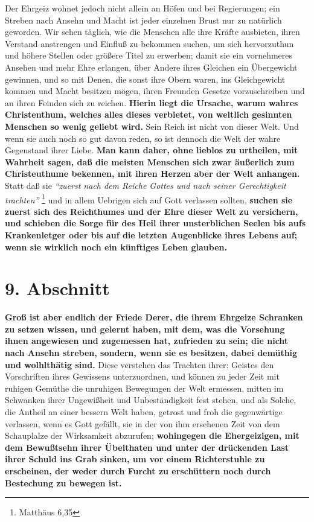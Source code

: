 Der Ehrgeiz wohnet jedoch nicht allein an Höfen und bei Regierungen; ein Streben
nach Ansehn und Macht ist jeder einzelnen Brust nur zu natürlich geworden. Wir
sehen täglich, wie die Menschen alle ihre Kräfte ausbieten, ihren Verstand
anstrengen und Einfluß zu bekommen suchen, um sich hervorzuthun und höhere
Stellen oder größere Titel zu erwerben; damit sie ein vornehmeres Ansehen und
mehr Ehre erlangen, über Andere ihres Gleichen ein Übergewicht gewinnen, und so
mit Denen, die sonst ihre Obern waren, ins Gleichgewicht kommen und Macht
besitzen mögen, ihren Freunden Gesetze vorzuschreiben und an ihren Feinden sich
zu reichen. \textbf{Hierin liegt die Ursache, warum wahres Christenthum, welches alles
dieses verbietet, von weltlich gesinnten Menschen so wenig geliebt wird.} Sein
Reich ist nicht von dieser Welt. Und wenn sie auch noch so gut davon reden, so
ist dennoch die Welt der wahre Gegenstand ihrer Liebe. \textbf{Man kann daher, ohne
lieblos zu urtheilen, mit Wahrheit sagen, daß die meisten Menschen sich zwar
äußerlich zum Christeuthume bekennen, mit ihren Herzen aber der Welt anhangen.}
Statt daß sie
\textit{"`zuerst nach dem Reiche Gottes und nach seiner Gerechtigkeit
trachten"'}
\footnote{Matthäus 6,35}
und in allem Uebrigen sich auf Gott verlassen
sollten, \textbf{suchen sie zuerst sich des Reichthumes und der Ehre dieser Welt zu
versichern, und schieben die Sorge für des Heil ihrer unsterblichen Seelen bis
aufs Krankenletger oder bis auf die letzten Augenblicke ihres Lebens auf; wenn
sie wirklich noch ein künftiges Leben glauben.}

\section{9. Abschnitt} \label{kap8_ab9}

\textbf{Groß ist aber endlich der Friede Derer, die ihrem Ehrgeize Schranken zu setzen
wissen, und gelernt haben, mit dem, was die Vorsehung ihnen angewiesen und
zugemessen hat, zufrieden zu sein; die nicht nach Ansehn streben, sondern, wenn
sie es besitzen, dabei demüthig und wolhlthätig sind.} Diese verstehen das
Trachten ihrer: Geistes den Vorschriften ihres Gewissens unterzuordnen, und
können zu jeder Zeit mit ruhigen Gemüthe die unruhigen Bewegungen der Welt
ermessen, mitten im Schwanken ihrer Ungewißheit und Unbeständigkeit fest stehen,
und als Solche, die Antheil an einer bessern Welt haben, getrost und froh die
gegenwärtige verlassen, wenn es Gott gefällt, sie in der von ihm ersehenen Zeit
von dem Schauplalze der Wirksamkeit abzurufen; \textbf{wohingegen die Ehergeizigen, mit
dem Bewußtsehn ihrer Übelthaten und unter der drückenden Last ihrer Schuld ins
Grab sinken, um vor einem Richterstuhle  zu erscheinen, der weder durch Furcht zu
erschüttern noch durch Bestechung zu bewegen ist.}

